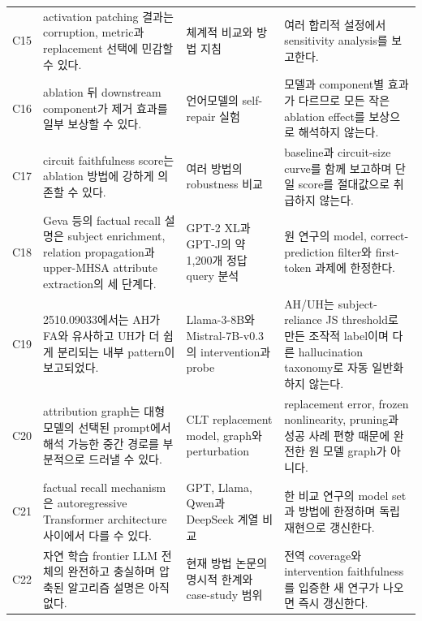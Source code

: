 \begin{longtable}{@{}p{}p{}p{}p{}@{}}
C15 & activation patching 결과는 corruption, metric과 replacement 선택에 민감할 수 있다. & 체계적 비교와 방법 지침 \citep{zhang2024activation,heimersheim2024patching} & 여러 합리적 설정에서 sensitivity analysis를 보고한다. \\

C16 & ablation 뒤 downstream component가 제거 효과를 일부 보상할 수 있다. & 언어모델의 self-repair 실험 \citep{mcgrath2023hydra} & 모델과 component별 효과가 다르므로 모든 작은 ablation effect를 보상으로 해석하지 않는다. \\

C17 & circuit faithfulness score는 ablation 방법에 강하게 의존할 수 있다. & 여러 방법의 robustness 비교 \citep{miller2024faithfulness} & baseline과 circuit-size curve를 함께 보고하며 단일 score를 절대값으로 취급하지 않는다. \\

C18 & Geva 등의 factual recall 설명은 subject enrichment, relation propagation과 upper-MHSA attribute extraction의 세 단계다. & GPT-2 XL과 GPT-J의 약 1,200개 정답 query 분석 \citep{geva2023recall} & 원 연구의 model, correct-prediction filter와 first-token 과제에 한정한다. \\

C19 & 2510.09033에서는 AH가 FA와 유사하고 UH가 더 쉽게 분리되는 내부 pattern이 보고되었다. & Llama-3-8B와 Mistral-7B-v0.3의 intervention과 probe \citep{cheang2026knowledge} & AH/UH는 subject-reliance JS threshold로 만든 조작적 label이며 다른 hallucination taxonomy로 자동 일반화하지 않는다. \\

C20 & attribution graph는 대형 모델의 선택된 prompt에서 해석 가능한 중간 경로를 부분적으로 드러낼 수 있다. & CLT replacement model, graph와 perturbation \citep{ameisen2025circuittracing,lindsey2025biology} & replacement error, frozen nonlinearity, pruning과 성공 사례 편향 때문에 완전한 원 모델 graph가 아니다. \\

C21 & factual recall mechanism은 autoregressive Transformer architecture 사이에서 다를 수 있다. & GPT, Llama, Qwen과 DeepSeek 계열 비교 \citep{choe2025crossarchitecture} & 한 비교 연구의 model set과 방법에 한정하며 독립 재현으로 갱신한다. \\

C22 & 자연 학습 frontier LLM 전체의 완전하고 충실하며 압축된 알고리즘 설명은 아직 없다. & 현재 방법 논문의 명시적 한계와 case-study 범위 \citep{ameisen2025circuittracing,lindsey2025biology} & 전역 coverage와 intervention faithfulness를 입증한 새 연구가 나오면 즉시 갱신한다. \\


\end{longtable}
